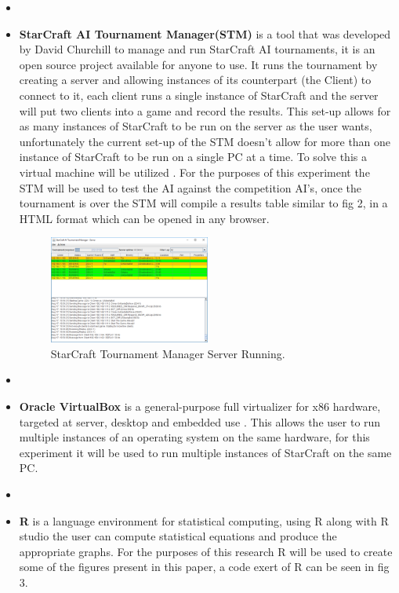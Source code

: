 \documentclass[journal]{IEEEtran}
\begin{document}
\begin{itemize}
	\item[]
	\item \textbf{StarCraft AI Tournament Manager(STM)} is a tool that was developed by David Churchill to manage and run StarCraft AI tournaments, it is an open source project available for anyone to use. It runs the tournament by creating a server and allowing instances of its counterpart (the Client) to connect to it, each client runs a single instance of StarCraft and the server will put two clients into a game and record the results. This set-up allows for as many instances of StarCraft to be run on the server as the user wants, unfortunately the current set-up of the STM doesn't allow for more than one instance of StarCraft to be run on a single PC at a time. To solve this a virtual machine will be utilized \cite{Tournament}. For the purposes of this experiment the STM will be used to test the AI against the competition AI's, once the tournament is over the STM will compile  a results table similar to fig 2, in a HTML format which can be opened in any browser.
	\begin{figure}
		\centering
		\includegraphics[width=0.5\textwidth]{TMPic}
		\caption{StarCraft Tournament Manager Server Running.}
		\label{Fig2}
	\end{figure}
	\item[]
	\item \textbf{Oracle VirtualBox} is a general-purpose full virtualizer for x86 hardware, targeted at server, desktop and embedded use \cite{Virtual}. This allows the user to run multiple instances of an operating system on the same hardware, for this experiment it will be used to run multiple instances of StarCraft on the same PC. 
	\item[]
	\item \textbf{R} is a language environment for statistical computing, using R along with R studio the user can compute statistical equations and produce the appropriate graphs. For the purposes of this research R will be used to create some of the figures present in this paper, a code exert of R can be seen in fig 3. 
	\newline
\end{itemize}
\end{document}
